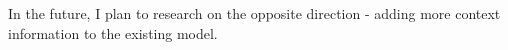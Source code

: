 \documentclass[modernstyle,12pt]{sjsuthesis}
\theoremstyle{definition}
\begin{document}
In the future, I plan to research on the opposite direction - adding more context information to the existing model.



%
%
%











\end{document}
